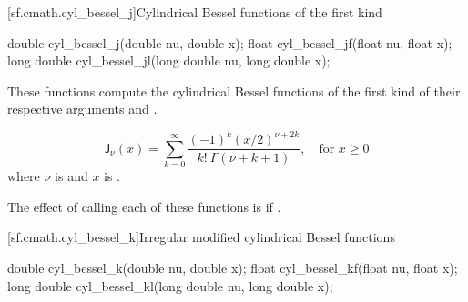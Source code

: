 [sf.cmath.cyl_bessel_j]{Cylindrical Bessel functions of the first kind}%
%
%
%
%
%
\begin{itemdecl}
double       cyl_bessel_j(double nu, double x);
float        cyl_bessel_jf(float nu, float x);
long double  cyl_bessel_jl(long double nu, long double x);
\end{itemdecl}

\begin{itemdescr}

\pnum\effects
These functions compute
the cylindrical Bessel functions of the first kind
of their respective arguments
 and .

\pnum\returns
\[%
  \mathsf{J}_\nu(x) =
  \sum_{k=0}^\infty \frac{(-1)^k (x/2)^{\nu+2k}}
			 {k! \: \Gamma(\nu+k+1)},
	   \quad \mbox{for $x \ge 0$}
\]
where
$\nu$ is  and
$x$ is .

\pnum\remarks
The effect of calling each of these functions
is 
if .
\end{itemdescr}

[sf.cmath.cyl_bessel_k]{Irregular modified cylindrical Bessel functions}%
%
%
%
%
%
\begin{itemdecl}
double       cyl_bessel_k(double nu, double x);
float        cyl_bessel_kf(float nu, float x);
long double  cyl_bessel_kl(long double nu, long double x);
\end{itemdecl}

